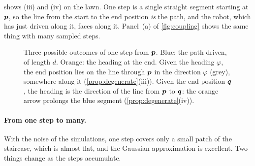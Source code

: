  shows (iii) and (iv) on the lawn. One step is a
single straight segment starting at $\bm{p}$, so the line from the start to the
end position \emph{is} the path, and the robot, which has just driven
along it, faces along it. Panel~(a) of \cref{fig:coupling} shows the same
thing with many sampled steps.

\begin{figure}[ht]
\centering
{}
\caption{Three possible outcomes of one step from $\bm{p}$. Blue: the path
driven, of length $d$. Orange: the heading at the end. Given the heading
$\varphi$, the end position lies on the line through $\bm{p}$ in the direction
$\varphi$ (grey), somewhere along it (\cref{prop:degenerate}(iii)). Given
the end position $\bm{q}$, the heading is the direction of the line from $\bm{p}$
to $\bm{q}$: the orange arrow prolongs the blue segment
(\cref{prop:degenerate}(iv)).}
\label{fig:onestepray}
\end{figure}

\paragraph{From one step to many.} With the noise of the simulations, one
step covers only a small patch of the staircase, which is almost flat, and
the Gaussian approximation is excellent. Two things change as the steps
accumulate.

